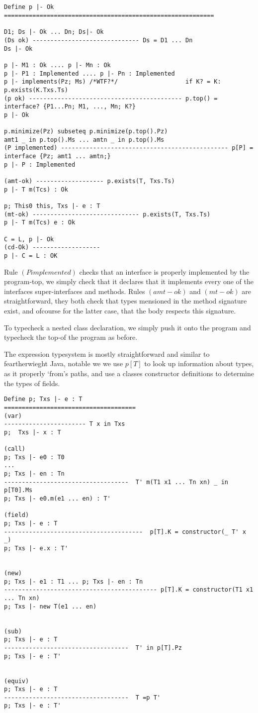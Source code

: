 \begin{verbatim}


Define p |- Ok
===========================================================

D1; Ds |- Ok ... Dn; Ds|- Ok
(Ds ok) ------------------------------ Ds = D1 ... Dn
Ds |- Ok

p |- M1 : Ok .... p |- Mn : Ok
p |- P1 : Implemented .... p |- Pn : Implemented
p |- implements(Pz; Ms) /*WTF?*/                   if K? = K: p.exists(K.Txs.Ts)
(p ok) ------------------------------------------- p.top() = interface? {P1...Pn; M1, ..., Mn; K?}
p |- Ok

p.minimize(Pz) subseteq p.minimize(p.top().Pz)
amt1 _ in p.top().Ms ... amtn _ in p.top().Ms
(P implemented) ----------------------------------------------- p[P] = interface {Pz; amt1 ... amtn;}
p |- P : Implemented

(amt-ok) ------------------- p.exists(T, Txs.Ts)
p |- T m(Tcs) : Ok

p; This0 this, Txs |- e : T
(mt-ok) ------------------------------ p.exists(T, Txs.Ts)
p |- T m(Tcs) e : Ok

C = L, p |- Ok
(cd-Ok) -------------------
p |- C = L : OK

\end{verbatim}

Rule $(P implemented)$ checks that an interface is properly implemented by the program-top, we simply check that it declares that it implements every one of the interfaces super-interfaces and methods.
Rules $(amt-ok)$ and $(mt-ok)$ are straightforward, they both check that types mensioned in the method signature exist, and ofcourse for the latter case, that the body respects this signature.

To typecheck a nested class declaration, we simply push it onto the program and typecheck the top-of the program as before.


The expression typesystem is mostly straightforward and similar to feartherwieght Java, notable we we use $p[T]$ to look up information about types, as it properly ‘from’s paths, and use a classes constructor definitions to determine the types of fields.

\begin{verbatim}
Define p; Txs |- e : T
=====================================
(var)
----------------------- T x in Txs
p;  Txs |- x : T

(call)
p; Txs |- e0 : T0
...
p; Txs |- en : Tn
-----------------------------------  T' m(T1 x1 ... Tn xn) _ in p[T0].Ms
p; Txs |- e0.m(e1 ... en) : T'

(field)
p; Txs |- e : T
---------------------------------------  p[T].K = constructor(_ T' x _)
p; Txs |- e.x : T'


(new)
p; Txs |- e1 : T1 ... p; Txs |- en : Tn
------------------------------------------- p[T].K = constructor(T1 x1 ... Tn xn)
p; Txs |- new T(e1 ... en)


(sub)
p; Txs |- e : T
-----------------------------------  T' in p[T].Pz
p; Txs |- e : T'


(equiv)
p; Txs |- e : T
-----------------------------------  T =p T'
p; Txs |- e : T'
\end{verbatim}